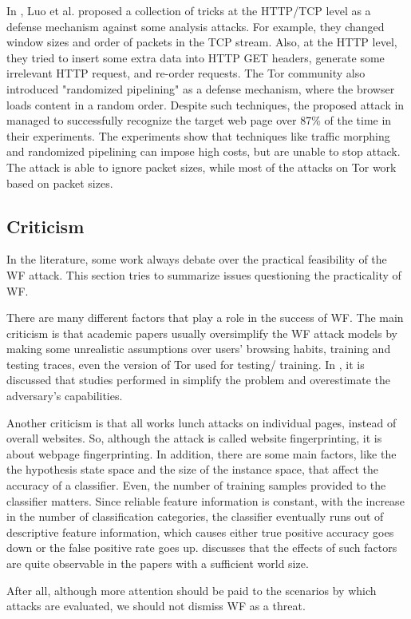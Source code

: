 In \cite{luo2011}, Luo et al. proposed a collection of tricks at the HTTP/TCP level as a defense mechanism against some analysis attacks. For example, they changed window sizes and order of packets in the TCP stream. Also, at the HTTP level, they tried to insert some extra data into HTTP GET headers, generate some irrelevant HTTP request, and re-order requests. The Tor community also introduced "randomized pipelining" \cite{perry11} as a defense mechanism, where the browser loads content in a random order. Despite such techniques, the proposed attack in \cite{cai2012touching} managed to successfully recognize the target web page over 87\% of the time in their experiments. The experiments show that techniques like traffic morphing and randomized pipelining can impose high costs, but are unable to stop attack. The attack is able to ignore packet sizes, while most of the attacks on Tor work based on packet sizes.

\subsection{Criticism}
In the literature, some work always debate over the practical feasibility of the WF attack. This section tries to summarize issues questioning the practicality of WF.

There are many different factors that play a role in the success of WF. The main criticism is that academic papers usually oversimplify the WF attack models by making some unrealistic assumptions over users' browsing habits, training and testing traces, even the version of Tor used for testing/ training. In \cite{juarez14}, it is discussed that studies performed in \cite{cai2012touching, herrmann2009, panchenko11, wang2013improved, shi2009} simplify the problem and overestimate the adversary's capabilities.

Another criticism is that all works lunch attacks on individual pages, instead of overall websites. So, although the attack is called website fingerprinting, it is about webpage fingerprinting. In addition, there are some main factors, like the the hypothesis state space and the size of the instance space, that affect the accuracy of a classifier. Even, the number of training samples provided to the classifier matters. Since reliable feature information is constant, with the increase in the number of classification categories, the classifier eventually runs out of descriptive feature information, which causes either true positive accuracy goes down or the false positive rate goes up. \cite{TorBlog} discusses that the effects of such factors are quite observable in the papers with a sufficient world size. 

After all, although more attention should be paid to the scenarios by which attacks are evaluated, we should not dismiss WF as a threat.
